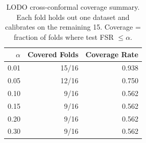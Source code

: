 \begin{table}[htbp]
\centering
\caption{LODO cross-conformal coverage summary. Each fold holds out one dataset and calibrates on the remaining 15. Coverage = fraction of folds where test FSR $\leq \alpha$.}
\label{tab:lodo_summary}
\small
\begin{tabular}{rrr}
\toprule
$\alpha$ & Covered Folds & Coverage Rate \\
\midrule
0.01 & 15/16 & 0.938 \\
0.05 & 12/16 & 0.750 \\
0.10 & 9/16 & 0.562 \\
0.15 & 9/16 & 0.562 \\
0.20 & 9/16 & 0.562 \\
0.30 & 9/16 & 0.562 \\
\bottomrule
\end{tabular}
\end{table}
